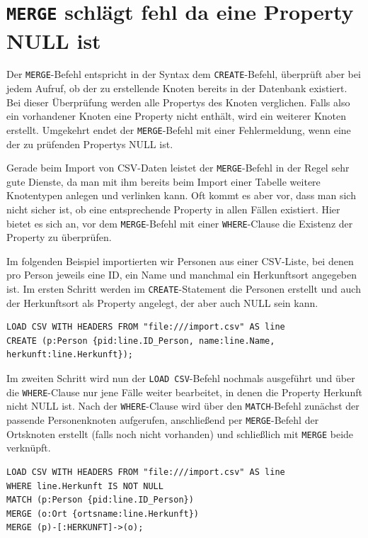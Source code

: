 \documentclass[ngerman,]{scrreprt}
\begin{document}
\section{\texorpdfstring{\texttt{MERGE} schlägt fehl da eine Property NULL ist}{MERGE schlägt fehl da eine Property NULL ist}}\label{merge-schluxe4gt-fehl-da-eine-property-null-ist}

Der \texttt{MERGE}-Befehl entspricht in der Syntax dem \texttt{CREATE}-Befehl, überprüft aber bei jedem Aufruf, ob der zu erstellende Knoten bereits in der Datenbank existiert. Bei dieser Überprüfung werden alle Propertys des Knoten verglichen. Falls also ein vorhandener Knoten eine Property nicht enthält, wird ein weiterer Knoten erstellt. Umgekehrt endet der \texttt{MERGE}-Befehl mit einer Fehlermeldung, wenn eine der zu prüfenden Propertys NULL ist.

Gerade beim Import von CSV-Daten leistet der \texttt{MERGE}-Befehl in der Regel sehr gute Dienste, da man mit ihm bereits beim Import einer Tabelle weitere Knotentypen anlegen und verlinken kann. Oft kommt es aber vor, dass man sich nicht sicher ist, ob eine entsprechende Property in allen Fällen existiert. Hier bietet es sich an, vor dem \texttt{MERGE}-Befehl mit einer \texttt{WHERE}-Clause die Existenz der Property zu überprüfen.

Im folgenden Beispiel importierten wir Personen aus einer CSV-Liste, bei denen pro Person jeweils eine ID, ein Name und manchmal ein Herkunftsort angegeben ist. Im ersten Schritt werden im \texttt{CREATE}-Statement die Personen erstellt und auch der Herkunftsort als Property angelegt, der aber auch NULL sein kann.

\begin{verbatim}
LOAD CSV WITH HEADERS FROM "file:///import.csv" AS line
CREATE (p:Person {pid:line.ID_Person, name:line.Name, herkunft:line.Herkunft});
\end{verbatim}

Im zweiten Schritt wird nun der \texttt{LOAD\ CSV}-Befehl nochmals ausgeführt und über die \texttt{WHERE}-Clause nur jene Fälle weiter bearbeitet, in denen die Property Herkunft nicht NULL ist. Nach der \texttt{WHERE}-Clause wird über den \texttt{MATCH}-Befehl zunächst der passende Personenknoten aufgerufen, anschließend per \texttt{MERGE}-Befehl der Ortsknoten erstellt (falls noch nicht vorhanden) und schließlich mit \texttt{MERGE} beide verknüpft.

\begin{verbatim}
LOAD CSV WITH HEADERS FROM "file:///import.csv" AS line
WHERE line.Herkunft IS NOT NULL
MATCH (p:Person {pid:line.ID_Person})
MERGE (o:Ort {ortsname:line.Herkunft})
MERGE (p)-[:HERKUNFT]->(o);
\end{verbatim}
\end{document}
